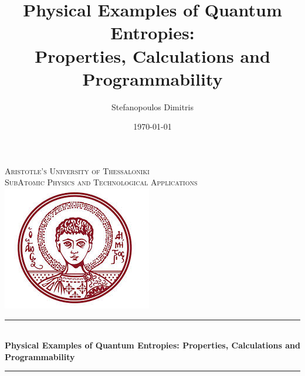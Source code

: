 \begin{titlepage}

\pagestyle{empty}
\title{Physical Examples of Quantum Entropies:\\ Properties, Calculations and Programmability}
\author{Stefanopoulos Dimitris}
\date{\today}

\newcommand{\HRule}{\rule{\linewidth}{0.5mm}} %

\begin{center}
 

\textsc{Aristotle's University of Thessaloniki}\\[1cm]
\textsc{SubAtomic Physics and Technological Applications}\\[3.5cm] 

\includegraphics[scale=0.8]{figures/authsymbol.png}\\ %


\HRule \\[0.4cm]
{\Large \bfseries Physical Examples of Quantum Entropies: Properties, Calculations and Programmability}\\[0.4cm] %
\HRule \\[1.5cm]
 

\end{center}
\end{titlepage}
